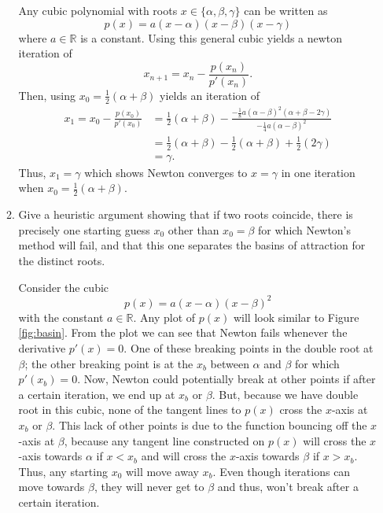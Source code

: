 \documentclass[a4paper,12pt]{article}
\newcommand{\reals}{\mathbb{R}}
\begin{document}
\begin{enumerate}[label = \arabic*.]
\begin{enumerate}[label = \roman*.]
			Any cubic polynomial with roots $ x \in \{\alpha, \beta, \gamma \} $ can be written as
			\[
				p(x) = a (x - \alpha)(x - \beta)(x - \gamma)
			\]
			where $ a \in \reals $ is a constant. Using this general cubic yields a newton iteration of
			\[
				x_{n+1} = x_n - \frac{p(x_n)}{p'(x_n)}.
			\]
			Then, using $ x_0 = \frac{1}{2}(\alpha + \beta) $ yields an iteration of
			\begin{align*}
				x_1 = x_0 - \frac{p(x_0)}{p'(x_0)} &= \frac{1}{2}(\alpha + \beta)  - \frac{-\frac{1}{8} a (\alpha - \beta)^2 (\alpha + \beta - 2\gamma)}{-\frac{1}{4} a (\alpha - \beta)^2} \\
				&= \frac{1}{2}(\alpha + \beta)  - \frac{1}{2}(\alpha + \beta) + \frac{1}{2} (2\gamma) \\
				&= \gamma.
			\end{align*}
			Thus, $ x_1 = \gamma $ which shows Newton converges to $ x = \gamma $ in one iteration when $ x_0 = \frac{1}{2}(\alpha + \beta) $.
			
			\item Give a heuristic argument showing that if two roots coincide, there is precisely one starting guess $ x_0 $ other than $ x_0 = \beta $ for which Newton's method will fail, and that this one separates the basins of attraction for the distinct roots.
			
			Consider the cubic
			\[
				p(x) = a (x - \alpha)(x - \beta)^2
			\]
			with the constant $ a \in \reals$.  Any plot of $ p(x) $ will look similar to Figure \ref{fig:basin}. From the plot we can see that Newton fails whenever the derivative $ p'(x) = 0 $. One of these breaking points in the double root at $ \beta $; the other breaking point is at the $ x_b $ between $ \alpha $ and $ \beta $ for which $ p'(x_b) = 0 $. Now, Newton could potentially break at other points if after a certain iteration, we end up at $ x_b $ or $ \beta $. But, because we have double root in this cubic, none of the tangent lines to $ p(x) $ cross the $ x $-axis at $ x_b $ or $ \beta $. This lack of other points is due to the function bouncing off the $ x $-axis at $ \beta $, because any tangent line constructed on $ p(x) $ will cross the $ x $-axis towards $ \alpha $ if $ x < x_b $ and will cross the $ x $-axis towards $ \beta $ if $ x > x_b $. Thus, any starting $ x_0 $ will move away $ x_b $. Even though iterations can move towards $ \beta $, they will never get to $ \beta $ and thus, won't break after a certain iteration.
			

\end{enumerate}
\end{enumerate}
\end{document}
